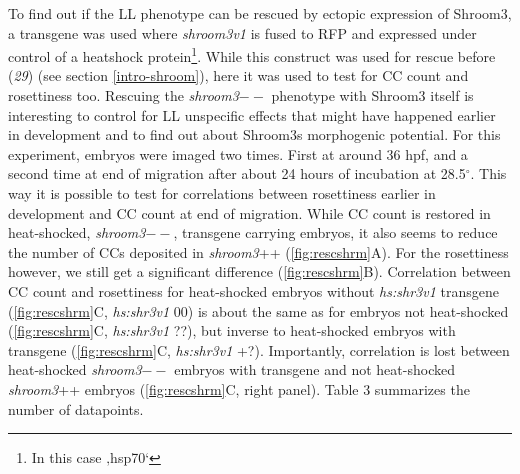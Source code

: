 \documentclass[11pt,singlespacinge,twoside]{reedthesis} %
\begin{document}
To find out if the LL phenotype can be rescued by ectopic expression of Shroom3, a transgene was used where \emph{shroom3v1} is fused to RFP and expressed under control of a heatshock protein\footnote{In this case ‚hsp70`}. While this construct was used for rescue before (\emph{29}) (see section \ref{intro-shroom}), here it was used to test for CC count and rosettiness too. Rescuing the \emph{shroom3}\(--\) phenotype with Shroom3 itself is interesting to control for LL unspecific effects that might have happened earlier in development and to find out about Shroom3s morphogenic potential.
For this experiment, embryos were imaged two times. First at around 36 hpf, and a second time at end of migration after about 24 hours of incubation at 28.5\(^\circ\). This way it is possible to test for correlations between rosettiness earlier in development and CC count at end of migration.
While CC count is restored in heat-shocked, \emph{shroom3}\(--\), transgene carrying embryos, it also seems to reduce the number of CCs deposited in \emph{shroom3}++ (\ref{fig:rescshrm}A). For the rosettiness however, we still get a significant difference (\ref{fig:rescshrm}B). Correlation between CC count and rosettiness for heat-shocked embryos without \emph{hs:shr3v1} transgene (\ref{fig:rescshrm}C, \emph{hs:shr3v1} 00) is about the same as for embryos not heat-shocked (\ref{fig:rescshrm}C, \emph{hs:shr3v1} ??), but inverse to heat-shocked embryos with transgene (\ref{fig:rescshrm}C, \emph{hs:shr3v1} +?). Importantly, correlation is lost between heat-shocked \emph{shroom3}\(--\) embryos with transgene and not heat-shocked \emph{shroom3}++ embryos (\ref{fig:rescshrm}C, right panel). Table 3 summarizes the number of datapoints.\newline
\end{document}
